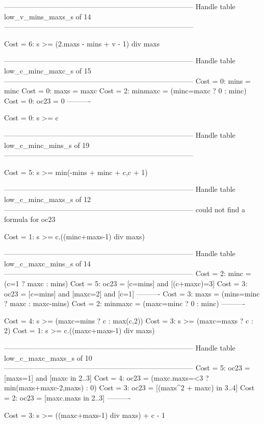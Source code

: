 --------------------------------------------------------------------------------
Handle table low_v_mins_maxs_s of 14
--------------------------------------------------------------------------------

Cost =  6:  s >= (2.maxs - mins + v - 1) div maxs

--------------------------------------------------------------------------------
Handle table low_c_minc_maxc_s of 15
--------------------------------------------------------------------------------
Cost =  0:  mins    = minc
Cost =  0:  maxs    = maxc
Cost =  2:  minmaxc = (minc=maxc ? 0 : minc)
Cost =  0:  oc23    = 0
----------

Cost =  0:  s >= c

--------------------------------------------------------------------------------
Handle table low_c_minc_mins_s of 19
--------------------------------------------------------------------------------

Cost =  5:  s >= min(-mins + minc + c,c + 1)

--------------------------------------------------------------------------------
Handle table low_c_minc_maxs_s of 12
--------------------------------------------------------------------------------
could not find a formula for oc23

Cost =  1:  s >= c.((minc+maxs-1) div maxs)

--------------------------------------------------------------------------------
Handle table low_c_maxc_mins_s of 14
--------------------------------------------------------------------------------
Cost =  2:  minc    = (c=1 ? maxc : mins)
Cost =  5:  oc23    = [c=mins] and [(c+maxc)=3]
Cost =  3:  oc23    = [c=mins] and [maxc=2] and [c=1]
----------
Cost =  3:  maxs    = (mins=minc ? maxc : maxc-mins)
Cost =  2:  minmaxc = (maxc=minc ? 0 : minc)
----------

Cost =  4:  s >= (maxc=mins ? c : max(c,2))
Cost =  3:  s >= (maxc=maxs ? c : 2)
Cost =  1:  s >= c.((maxc+maxs-1) div maxs)

--------------------------------------------------------------------------------
Handle table low_c_maxc_maxs_s of 10
--------------------------------------------------------------------------------
Cost =  5:  oc23 = [maxs=1] and [maxc in 2..3]
Cost =  4:  oc23 = (maxc.maxs=<3 ? min(maxs+maxc-2,maxs) : 0)
Cost =  3:  oc23 = [(maxs^2 + maxc) in 3..4]
Cost =  2:  oc23 = [maxc.maxs in 2..3]
----------

Cost =  3:  s >= ((maxc+maxs-1) div maxs) + c - 1

